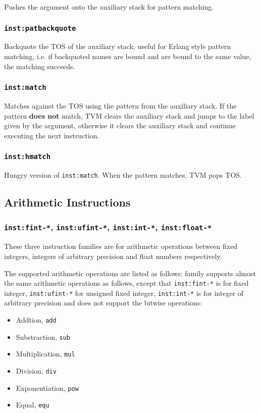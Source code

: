 \documentclass{article}
\newcommand{\inst}[1] {\texttt{inst:#1}}
\begin{document}
Pushes the argument onto the auxiliary stack for pattern matching.

\subsubsection{\inst{patbackquote}}

Backquote the TOS of the auxiliary stack, useful for Erlang style pattern matching, i.e. if backquoted names are bound and are bound to the same value, the matching succeeds.

\subsubsection{\inst{match}}

Matches against the TOS using the pattern from the auxiliary stack. If the pattern \textbf{does not} match, TVM clears the auxiliary stack and jumps to the label given by the argument, otherwise it clears the auxiliary stack and continue executing the next instruction.

\subsubsection{\inst{hmatch}}

Hungry version of \inst{match}. When the pattern matches, TVM pops TOS.

\subsection{Arithmetic Instructions}

\subsubsection{\inst{fint-*}, \inst{ufint-*}, \inst{int-*}, \inst{float-*}}

These three instruction families are for arithmetic operations between fixed integers, integers of arbitrary precision and float numbers respectively.

The supported arithmetic operations are listed as follows:
family supports almost the same arithmetic operations as follows, except that \inst{fint-*} is for fixed integer, \inst{ufint-*} for unsigned fixed integer, \inst{int-*} is for integer of arbitrary precision and does not support the bitwise operations:
\begin{itemize}
\item Addtion, \texttt{add}
\item Substraction, \texttt{sub}
\item Multiplication, \texttt{mul}
\item Division, \texttt{div}
\item Exponentiation, \texttt{pow}
\item Equal, \texttt{equ}
\end{itemize}
\end{document}
